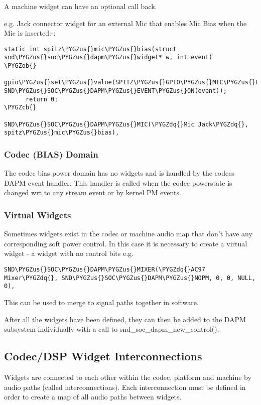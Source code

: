 \documentclass[a4paper,8pt,english]{sphinxmanual}
\def\PYGZus{\char`\_}
\def\PYGZob{\char`\{}
\def\PYGZcb{\char`\}}
\def\PYGZdq{\char`\"}
\begin{document}
A machine widget can have an optional call back.

e.g. Jack connector widget for an external Mic that enables Mic Bias
when the Mic is inserted:-:

\begin{Verbatim}[commandchars=\\\{\}]
static int spitz\PYGZus{}mic\PYGZus{}bias(struct snd\PYGZus{}soc\PYGZus{}dapm\PYGZus{}widget* w, int event)
\PYGZob{}
      gpio\PYGZus{}set\PYGZus{}value(SPITZ\PYGZus{}GPIO\PYGZus{}MIC\PYGZus{}BIAS, SND\PYGZus{}SOC\PYGZus{}DAPM\PYGZus{}EVENT\PYGZus{}ON(event));
      return 0;
\PYGZcb{}

SND\PYGZus{}SOC\PYGZus{}DAPM\PYGZus{}MIC(\PYGZdq{}Mic Jack\PYGZdq{}, spitz\PYGZus{}mic\PYGZus{}bias),
\end{Verbatim}


\subsubsection{Codec (BIAS) Domain}
\label{sound/soc/dapm:codec-bias-domain}
The codec bias power domain has no widgets and is handled by the codecs DAPM
event handler. This handler is called when the codec powerstate is changed wrt
to any stream event or by kernel PM events.


\subsubsection{Virtual Widgets}
\label{sound/soc/dapm:virtual-widgets}
Sometimes widgets exist in the codec or machine audio map that don't have any
corresponding soft power control. In this case it is necessary to create
a virtual widget - a widget with no control bits e.g.

\begin{Verbatim}[commandchars=\\\{\}]
SND\PYGZus{}SOC\PYGZus{}DAPM\PYGZus{}MIXER(\PYGZdq{}AC97 Mixer\PYGZdq{}, SND\PYGZus{}SOC\PYGZus{}DAPM\PYGZus{}NOPM, 0, 0, NULL, 0),
\end{Verbatim}

This can be used to merge to signal paths together in software.

After all the widgets have been defined, they can then be added to the DAPM
subsystem individually with a call to snd\_soc\_dapm\_new\_control().


\subsection{Codec/DSP Widget Interconnections}
\label{sound/soc/dapm:codec-dsp-widget-interconnections}
Widgets are connected to each other within the codec, platform and machine by
audio paths (called interconnections). Each interconnection must be defined in
order to create a map of all audio paths between widgets.
\end{document}
